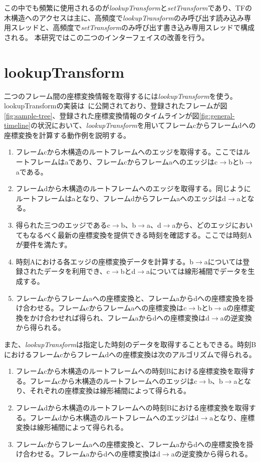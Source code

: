 \documentclass[a4paper]{jreport}	%
\begin{document}
この中でも頻繁に使用されるのが\textit{lookupTransform}と\textit{setTransform}であり、TFの木構造へのアクセスは主に、高頻度で\textit{lookupTransform}のみ呼び出す読み込み専用スレッドと、高頻度で\textit{setTransform}のみ呼び出す書き込み専用スレッドで構成される。
本研究ではこの二つのインターフェイスの改善を行う。


\section{lookupTransform}
\label{section:lookupTrnasform}

二つのフレーム間の座標変換情報を取得するには\textit{lookupTransform}を使う。lookupTransformの実装は~\cite{lookupTransform}に公開されており、登録されたフレームが図\ref{fig:sample-tree}、登録された座標変換情報のタイムラインが図\ref{fig:general-timeline}の状況において、\textit{lookupTransform}を用いてフレームcからフレームdへの座標変換を計算する動作例を説明する。

\begin{enumerate}
	\item フレームcから木構造のルートフレームへのエッジを取得する。ここではルートフレームはaであり、フレームcからフレームaへのエッジはc$\rightarrow$bとb$\rightarrow$aである。
	\item フレームdから木構造のルートフレームへのエッジを取得する。同じようにルートフレームはaとなり、フレームdからフレームaへのエッジはd$\rightarrow$aとなる。
	\item 得られた三つのエッジであるc$\rightarrow$b、b$\rightarrow$a、d$\rightarrow$aから、どのエッジにおいてもなるべく最新の座標変換を提供できる時刻を確認する。ここでは時刻Aが要件を満たす。
	\item 時刻Aにおける各エッジの座標変換データを計算する。b$\rightarrow$aについては登録されたデータを利用でき、c$\rightarrow$bとd$\rightarrow$aについては線形補間でデータを生成する。
	\item フレームcからフレームaへの座標変換と、フレームaからdへの座標変換を掛け合わせる。フレームcからフレームaへの座標変換はc$\rightarrow$bとb$\rightarrow$aの座標変換をかけ合わせれば得られ、フレームaからdへの座標変換はd$\rightarrow$aの逆変換から得られる。
\end{enumerate}
また、\textit{lookupTransform}は指定した時刻のデータを取得することもできる。時刻Bにおけるフレームcからフレームdへの座標変換は次のアルゴリズムで得られる。

\begin{enumerate}
	\item フレームcから木構造のルートフレームへの時刻Bにおける座標変換を取得する。フレームcから木構造のルートフレームへのエッジはc$\rightarrow$b、b$\rightarrow$aとなり、それぞれの座標変換は線形補間によって得られる。
	\item フレームdから木構造のルートフレームへの時刻Bにおける座標変換を取得する。フレームdから木構造のルートフレームへのエッジはd$\rightarrow$aとなり、座標変換は線形補間によって得られる。
	\item フレームcからフレームaへの座標変換と、フレームaからdへの座標変換を掛け合わせる。フレームaからdへの座標変換はd$\rightarrow$aの逆変換から得られる。
\end{enumerate}
\end{document}
